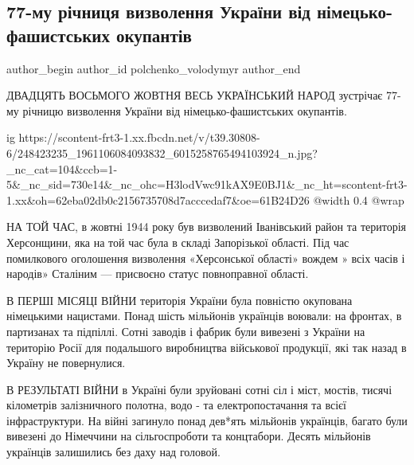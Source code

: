  
 
 
 
 
 
\subsection{77-му річниця визволення України від німецько-фашистських окупантів}
\label{sec:28_10_2021.fb.polchenko_volodymyr.1.77_let_osvobozhdenie_ukraina}
 
\ifcmt
 author_begin
   author_id polchenko_volodymyr
 author_end
\fi

ДВАДЦЯТЬ ВОСЬМОГО ЖОВТНЯ ВЕСЬ УКРАЇНСЬКИЙ НАРОД зустрічає 77-му річницю
визволення України від німецько-фашистських окупантів.

\ifcmt
  ig https://scontent-frt3-1.xx.fbcdn.net/v/t39.30808-6/248423235_1961106084093832_6015258765494103924_n.jpg?_nc_cat=104&ccb=1-5&_nc_sid=730e14&_nc_ohc=H3lodVwc91kAX9E0BJ1&_nc_ht=scontent-frt3-1.xx&oh=62eba02db0c2156735708d7acccedaf7&oe=61B24D26
  @width 0.4
  @wrap 
\fi

НА ТОЙ ЧАС, в жовтні 1944 року був визволений Іванівський район та
територія Херсонщини, яка на той час була в складі Запорізької області.
Під час помилкового оголошення визволення «Херсонської області» вождем »
всіх часів і народів» Сталіним — присвоєно статус повноправної області.

В ПЕРШІ МІСЯЦІ ВІЙНИ територія України була повністю окупована
німецькими нацистами. Понад шість мільйонів українців воювали: на
фронтах, в партизанах та підпіллі. Сотні заводів і фабрик були вивезені
з України на територію Росії для подальшого виробництва військової
продукції, які так назад в Україну не повернулися. 

В РЕЗУЛЬТАТІ ВІЙНИ в Україні були зруйовані сотні сіл і міст, мостів,
тисячі кілометрів залізничного полотна, водо - та електропостачання та
всієї інфраструктури. На війні загинуло понад дев*ять мільйонів українців,
багато були вивезені до Німеччини на сільгоспроботи та концтабори. Десять
мільйонів українців залишились без даху над головой.

